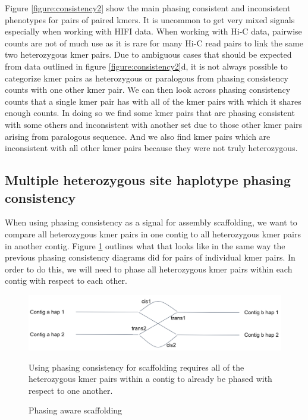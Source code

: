 \par{
Figure \ref{figure:consistency2} show the main phasing consistent and inconsistent phenotypes for pairs of paired kmers. It is uncommon to get very mixed signals especially when working with HIFI data. When working with Hi-C data, pairwise counts are not of much use as it is rare for many Hi-C read pairs to link the same two heterozygous kmer pairs. Due to ambiguous cases that should be expected from data outlined in figure \ref{figure:consistency2}d, it is not always possible to categorize kmer pairs as heterozygous or paralogous from phasing consistency counts with one other kmer pair. We can then look across phasing consistency counts that a single kmer pair has with all of the kmer pairs with which it shares enough counts. In doing so we find some kmer pairs that are phasing consistent with some others and inconsistent with another set due to those other kmer pairs arising from paralogous sequence. And we also find kmer pairs which are inconsistent with all other kmer pairs because they were not truly heterozygous.
}



\subsection{Multiple heterozygous site haplotype phasing consistency}

\par{
When using phasing consistency as a signal for assembly scaffolding, we want to compare all heterozygous kmer pairs in one contig to all heterozygous kmer pairs in another contig. Figure \ref{figure:scaff} outlines what that looks like in the same way the previous phasing consistency diagrams did for pairs of individual kmer pairs. In order to do this, we will need to phase all heterozygous kmer pairs within each contig with respect to each other.
}

\begin{figure}[htbp!]

\caption{Phasing aware scaffolding}
\label{figure:scaff}
\begin{centering}
\includegraphics[width=\textwidth]{phasescaff.png}
\par{Using phasing consistency for scaffolding requires all of the heterozygous kmer pairs within a contig to already be phased with respect to one another.}
\end{centering}
\end{figure}

